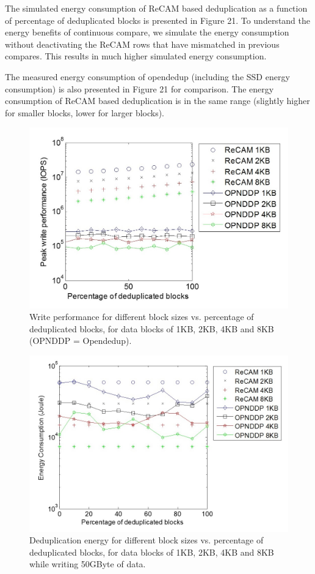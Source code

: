 \documentclass{superfri}
\begin{document}
The simulated energy consumption of ReCAM based deduplication as a function of percentage of deduplicated blocks is presented in Figure 21. To understand the energy benefits of continuous compare, we simulate the energy consumption without deactivating the ReCAM rows that have mismatched in previous compares. This results in much higher simulated energy consumption. 

The measured energy consumption of opendedup (including the SSD energy consumption) is also presented in Figure 21 for comparison. The energy consumption of ReCAM based deduplication is in the same range (slightly higher for smaller blocks, lower for larger blocks).

\begin{figure}[ht!]
	\centerline{\includegraphics[scale=1]{Figures/dedup_perf.jpg}}
	\caption{Write performance for different block sizes vs. percentage of deduplicated blocks, for data blocks of 1KB, 2KB, 4KB and 8KB (OPNDDP = Opendedup).}
	\label{fig:dedup_performance}
\end{figure}

\begin{figure}[h!]
	\centerline{\includegraphics[scale=1]{Figures/dedup_energy.jpg}}
	\caption{Deduplication energy for different block sizes vs. percentage of deduplicated blocks, for data blocks of 1KB, 2KB, 4KB and 8KB while writing 50GByte of data.}
	\label{fig:dedup_energy}
\end{figure}
\end{document}
